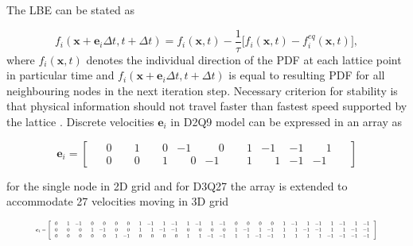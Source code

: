 The LBE can be stated as

\begin{equation}
	\label{eq:lbe-bgk}
	f_i (\bm{x}+\bm{e}_i\Delta t,t+\Delta t) = f_i (\bm{x},t)-\frac{1}{\tau}\Big[f_i (\bm{x},t) - f_i^{eq} (\bm{x},t)\Big],
\end{equation}
where $f_i (\bm{x},t)$ denotes the individual direction of the PDF at each lattice point in particular time and $f_i (\bm{x}+\bm{e}_i\Delta t,t+\Delta t)$ is equal to resulting PDF for all neighbouring nodes in the next iteration step. Necessary criterion for stability is that physical information should not travel faster than fastest speed supported by the lattice \citep{succi2001lattice}. Discrete velocities $\bm{e}_i$ in D2Q9 model can be expressed in an array as

\begin{equation}
	\label{discrete-velocities}
	\bm{e}_i = \begin{bmatrix}
		\phantom{-}0 & \phantom{-}1 & \phantom{-}0 &-1 & \phantom{-}0 & \phantom{-}1 &-1 &-1 & \phantom{-}1\phantom{-}\\
		\phantom{-}0 & \phantom{-}0 & \phantom{-}1 & \phantom{-}0 &-1 & \phantom{-}1 & \phantom{-}1 &-1 &-1\phantom{-}
	\end{bmatrix}
\end{equation}

for the single node in 2D grid and for D3Q27 the array is extended to accommodate 27 velocities moving in 3D grid

\begin{equation}
	\label{discrete-velocities-3d}
	\resizebox{0.89\textwidth}{!}{$\bm{e}_i = \left[ \begin{array}{@{}*{27}{c}@{}}
			\phantom{-}0 & \phantom{-}1 &-1 & \phantom{-}0 & \phantom{-}0 & \phantom{-}0 & \phantom{-}0 & \phantom{-}1 &-1 & \phantom{-}1 &-1 & \phantom{-}1 &-1 & \phantom{-}1 &-1 & \phantom{-}0 & \phantom{-}0 & \phantom{-}0 & \phantom{-}0 & \phantom{-}1&-1 & \phantom{-}1 &-1 & \phantom{-}1 &-1 & \phantom{-}1 &-1 \phantom{-} \\
			\phantom{-}0 & \phantom{-}0 & \phantom{-}0 & \phantom{-}1 &-1 & \phantom{-}0 & \phantom{-}0 & \phantom{-}1 & \phantom{-}1 &-1 &-1 & \phantom{-}0 & \phantom{-}0 & \phantom{-}0 & \phantom{-}0 & \phantom{-}1 &-1 & \phantom{-}1 &-1 & \phantom{-}1 & \phantom{-}1 &-1 &-1 & \phantom{-}1 & \phantom{-}1 &-1 &-1 \phantom{-} \\
			\phantom{-}0 & \phantom{-}0 & \phantom{-}0 & \phantom{-}0 & \phantom{-}0 & \phantom{-}1 &-1 & \phantom{-}0 & \phantom{-}0 & \phantom{-}0 & \phantom{-}0 & \phantom{-}1 & \phantom{-}1 &-1 &-1 & \phantom{-}1 & \phantom{-}1 &-1 &-1 & \phantom{-}1 & \phantom{-}1 & \phantom{-}1 & \phantom{-}1 &-1 &-1 &-1 &-1\phantom{-}
		\end{array} \right]$}
\end{equation}

